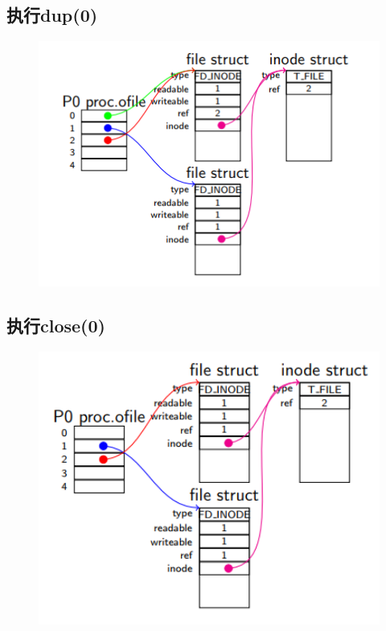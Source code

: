\documentclass[a4paper,12pt]{report}
\begin{document}
\subsection{ 执行dup(0)}	
\begin{figure}[H]
	\centering
	\includegraphics [width=1.0\textwidth]{figure//image159.png}
\end{figure}
\subsection{ 执行close(0)}	
\begin{figure}[H]
	\centering
	\includegraphics [width=1.0\textwidth]{figure//image160.png}
\end{figure}
\end{document}
